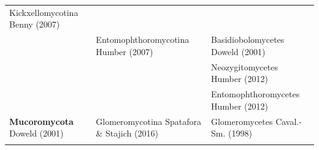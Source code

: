 \documentclass[]{book}
\begin{document}
\begin{longtable}[]{@{}lll@{}}
\begin{minipage}[t]{0.28\columnwidth}
Kickxellomycotina Benny (2007)\strut
\end{minipage} & \begin{minipage}[t]{0.31\columnwidth}\raggedright\strut
\strut
\end{minipage}\tabularnewline
\begin{minipage}[t]{0.32\columnwidth}\raggedright\strut
\strut
\end{minipage} & \begin{minipage}[t]{0.28\columnwidth}\raggedright\strut
Entomophthoromycotina Humber (2007)\strut
\end{minipage} & \begin{minipage}[t]{0.31\columnwidth}\raggedright\strut
Basidiobolomycetes Doweld (2001)\strut
\end{minipage}\tabularnewline
\begin{minipage}[t]{0.32\columnwidth}\raggedright\strut
\strut
\end{minipage} & \begin{minipage}[t]{0.28\columnwidth}\raggedright\strut
\strut
\end{minipage} & \begin{minipage}[t]{0.31\columnwidth}\raggedright\strut
Neozygitomycetes Humber (2012)\strut
\end{minipage}\tabularnewline
\begin{minipage}[t]{0.32\columnwidth}\raggedright\strut
\strut
\end{minipage} & \begin{minipage}[t]{0.28\columnwidth}\raggedright\strut
\strut
\end{minipage} & \begin{minipage}[t]{0.31\columnwidth}\raggedright\strut
Entomophthoromycetes Humber (2012)\strut
\end{minipage}\tabularnewline
\begin{minipage}[t]{0.32\columnwidth}\raggedright\strut
\textbf{Mucoromycota} Doweld (2001)\strut
\end{minipage} & \begin{minipage}[t]{0.28\columnwidth}\raggedright\strut
Glomeromycotina Spatafora \& Stajich (2016)\strut
\end{minipage} & \begin{minipage}[t]{0.31\columnwidth}\raggedright\strut
Glomeromycetes Caval.-Sm. (1998)\strut
\end{minipage}\tabularnewline
\begin{minipage}[t]{0.32\columnwidth}\raggedright\strut
\strut
\end{minipage} & \begin{minipage}[t]{0.28\columnwidth}\raggedright\strut

\end{minipage}
\end{longtable}
\end{document}
